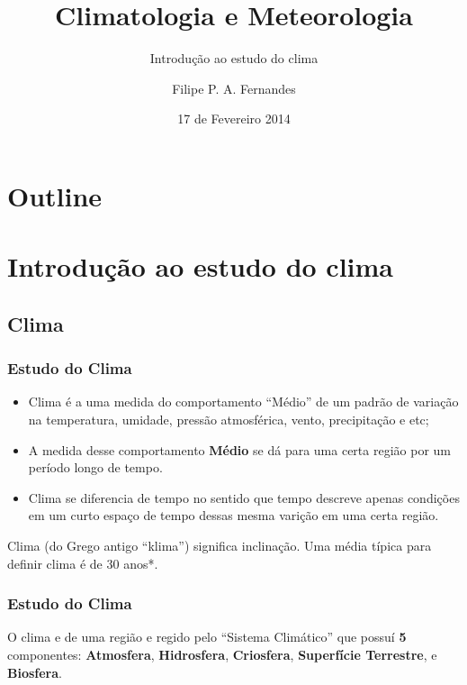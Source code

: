 \title[Aula 02]{Climatologia e Meteorologia}
\subtitle{Introdução ao estudo do clima}
\author[Filipe Fernandes]{Filipe P. A. Fernandes}
\date[Fevereiro 2014]{17 de Fevereiro 2014}




\begin{frame}[plain]
  \titlepage
\end{frame}

\section*{Outline}
\begin{frame}
\tableofcontents
\end{frame}

\section{Introdução ao estudo do clima}
\subsection{Clima}

\begin{frame}
\frametitle{Estudo do Clima}
  \begin{itemize}[<+-| alert@+>]
  \item Clima é a uma medida do comportamento ``Médio'' de um padrão de
        variação na temperatura, umidade, pressão atmosférica, vento,
        precipitação e etc;
  \item A medida desse comportamento {\bf Médio} se dá para uma certa região por
        um período longo de tempo.
  \item Clima se diferencia de tempo no sentido que tempo descreve apenas
        condições em um curto espaço de tempo dessas mesma varição em uma certa
        região.
  \end{itemize}
\pause
{\scriptsize Clima (do Grego antigo ``klima'') significa inclinação.  Uma média
típica para definir clima é de 30 anos*.}
\end{frame}

\begin{frame}
\frametitle{Estudo do Clima}
  \begin{block}{}
    O clima e de uma região e regido pelo ``Sistema Climático'' que possuí
    {\bf 5}     componentes: {\bf Atmosfera}, {\bf Hidrosfera}, {\bf Criosfera},
    {\bf Superfície Terrestre}, e {\bf Biosfera}.
  \end{block}
\end{frame}

